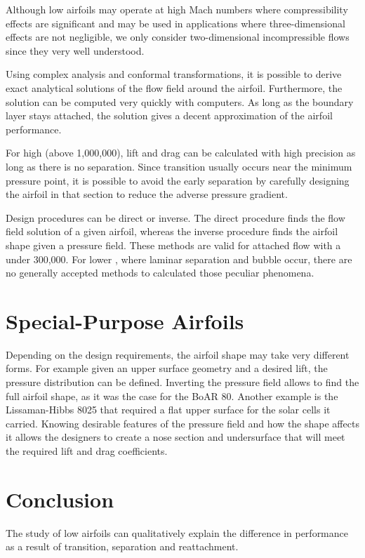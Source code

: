 \documentclass[letterpaper,12pt,]{article}
\begin{document}
Although low \rn airfoils may operate at high Mach numbers where compressibility effects are significant and may be used in applications where three-dimensional effects are not negligible, we only consider two-dimensional incompressible flows since they very well understood.

Using complex analysis and conformal transformations, it is possible to derive exact analytical solutions of the flow field around the airfoil. Furthermore, the solution can be computed very quickly with computers. As long as the boundary layer stays attached, the solution gives a decent approximation of the airfoil performance. 

For high \rn (above 1,000,000), lift and drag can be calculated with high precision as long as there is no separation. Since transition usually occurs near the minimum pressure point, it is possible to avoid the early separation by carefully designing the airfoil in that section to reduce the adverse pressure gradient.

Design procedures can be direct or inverse. The direct procedure finds the flow field solution of a given airfoil, whereas the inverse procedure finds the airfoil shape given a pressure field. These methods are valid for attached flow with a \rn under 300,000. For lower \rn, where laminar separation and bubble occur, there are no generally accepted methods to calculated those peculiar phenomena.

\section{Special-Purpose Airfoils}

Depending on the design requirements, the airfoil shape may take very different forms. For example given an upper surface geometry and a desired lift, the pressure distribution can be defined. Inverting the pressure field allows to find the full airfoil shape, as it was the case for the BoAR 80. Another example is the Lissaman-Hibbs 8025 that required a flat upper surface for the solar cells it carried. Knowing desirable features of the pressure field and how the shape affects it allows the designers to create a nose section and undersurface that will meet the required lift and drag coefficients.

\section{Conclusion}

The study of low \rn airfoils can qualitatively explain the difference in performance as a result of transition, separation and reattachment. 

%
%
\end{document}

